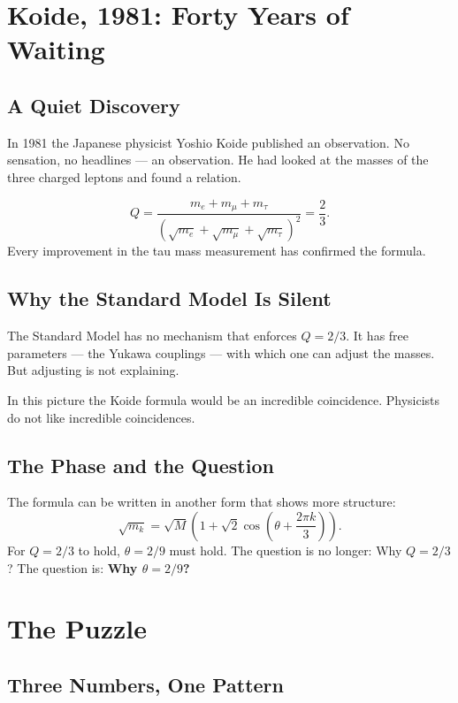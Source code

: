 \documentclass[12pt,oneside]{book}
\begin{document}
\chapter{Koide, 1981: Forty Years of Waiting}

\section{A Quiet Discovery}

In 1981 the Japanese physicist Yoshio Koide published an observation. No sensation, no headlines --- an observation. He had looked at the masses of the three charged leptons and found a relation.

\begin{merkbox}
\[
Q = \frac{m_e + m_\mu + m_\tau}{(\sqrt{m_e} + \sqrt{m_\mu} + \sqrt{m_\tau})^2} = \frac{2}{3}.
\]
Every improvement in the tau mass measurement has confirmed the formula.
\end{merkbox}

\section{Why the Standard Model Is Silent}

The Standard Model has no mechanism that enforces $Q = 2/3$. It has free parameters --- the Yukawa couplings --- with which one can adjust the masses. But adjusting is not explaining.

In this picture the Koide formula would be an incredible coincidence. Physicists do not like incredible coincidences.

\section{The Phase and the Question}

The formula can be written in another form that shows more structure:
\[
\sqrt{m_k} = \sqrt{M} \left(1 + \sqrt{2} \cos\left(\theta + \frac{2\pi k}{3}\right)\right).
\]
For $Q = 2/3$ to hold, $\theta = 2/9$ must hold. The question is no longer: Why $Q = 2/3$? The question is: \textbf{Why $\theta = 2/9$?}

\chapter{The Puzzle}

\section{Three Numbers, One Pattern}
\end{document}
